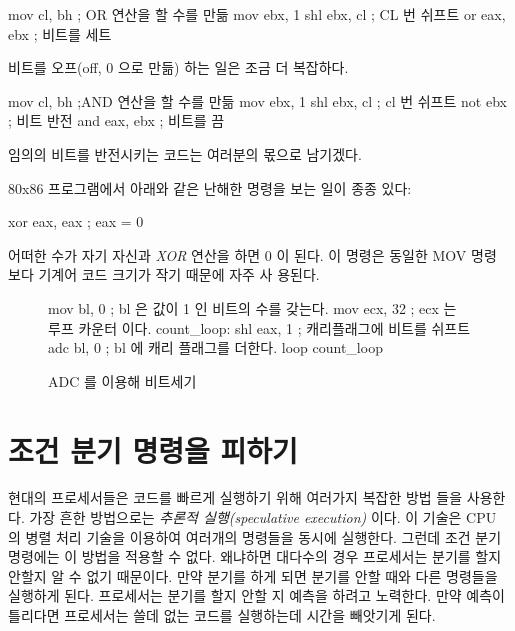 \begin{AsmCodeListing}[frame=none]
      mov    cl, bh          ; OR 연산을 할 수를 만듦
      mov    ebx, 1
      shl    ebx, cl         ; CL 번 쉬프트
      or     eax, ebx        ; 비트를 세트
\end{AsmCodeListing}

비트를 오프(off, 0 으로 만듦) 하는 일은 조금 더 복잡하다. 
\begin{AsmCodeListing}[frame=none]
      mov    cl, bh          ;AND 연산을 할 수를 만듦
      mov    ebx, 1
      shl    ebx, cl         ; cl 번 쉬프트
      not    ebx             ; 비트 반전
      and    eax, ebx        ; 비트를 끔 
\end{AsmCodeListing}
임의의 비트를 반전시키는 코드는 여러분의 몫으로 남기겠다. 

80x86 프로그램에서 아래와 같은 난해한 명령을 보는 일이 종종 있다:

\begin{AsmCodeListing}[frame=none,numbers=none]
      xor    eax, eax         ; eax = 0
\end{AsmCodeListing}
어떠한 수가 자기 자신과 \emph{XOR} 연산을 하면 0 이 된다. 이 명령은 
동일한 {\code MOV} 명령 보다 기계어 코드 크기가 작기 때문에 자주 사
용된다. 


\begin{figure}[t]
\begin{AsmCodeListing}
      mov    bl, 0           ; bl 은 값이 1 인 비트의 수를 갖는다. 
      mov    ecx, 32         ; ecx 는 루프 카운터 이다. 
count_loop:
      shl    eax, 1          ; 캐리플래그에 비트를 쉬프트 
      adc    bl, 0           ; bl 에 캐리 플래그를 더한다. 
      loop   count_loop
\end{AsmCodeListing}
\caption{{\code ADC} 를 이용해 비트세기\label{fig:countBitsAdc}}
\end{figure}

\section{조건 분기 명령을 피하기}
현대의 프로세서들은 코드를 빠르게 실행하기 위해 여러가지 복잡한 방법
들을 사용한다. 가장 흔한 방법으로는 \emph{추론적 실행(speculative execution)}
 이다. 이 기술은 CPU 의 병렬 처리 기술을 이용하여 여러개의 
명령들을 동시에 실행한다. 그런데 조건 분기 명령에는 이 방법을 적용할 수 없다. 
왜냐하면 대다수의 경우 프로세서는 분기를 할지 안할지 알 수 없기 때문이다. 만약
분기를 하게 되면 분기를 안할 때와 다른 명령들을 실행하게 된다. 프로세서는 
분기를 할지 안할 지 예측을 하려고 노력한다. 만약 예측이 틀리다면 프로세서는
쓸데 없는 코드를 실행하는데 시간을 빼앗기게 된다. 

